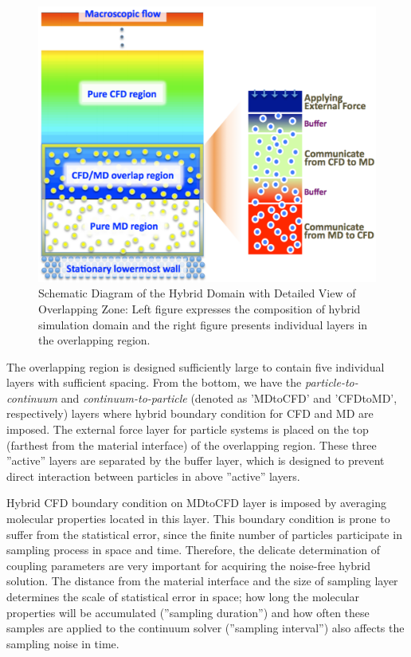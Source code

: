 \documentclass[]{aiaa-tc}%
\begin{document}
\begin{figure}
\centering
\includegraphics[width=0.6\linewidth]{Hybrid_Schematic.pdf}
\caption{Schematic Diagram of the Hybrid Domain with Detailed View of Overlapping Zone: 
Left figure expresses the composition of hybrid simulation domain and 
the right figure presents individual layers in the overlapping region.}
\label{Fig:Couette}
\end{figure}


The overlapping region is designed sufficiently large to contain 
five individual layers with sufficient spacing. From the bottom, 
we have the {\it{particle-to-continuum}} and {\it{continuum-to-particle}} 
(denoted as 'MDtoCFD' and 'CFDtoMD', respectively) layers where hybrid
boundary condition for CFD and MD are imposed. The external force layer
for particle systems is placed on the top (farthest from the
material interface) of the overlapping region. These three ''active'' layers 
are separated by the buffer layer, which is designed to prevent direct 
interaction between particles in above ''active'' layers.

Hybrid CFD boundary condition on MDtoCFD layer is imposed by averaging
molecular properties located in this layer. This boundary condition is prone to
suffer from the statistical error\cite{Hadjicon3,Time_Mechanism}, since
the finite number of particles participate in sampling process in space and time.
Therefore, the delicate determination of coupling parameters are very important
for acquiring the noise-free hybrid solution. The distance from the material 
interface and the size of sampling layer determines the scale of statistical 
error in space; how long the molecular properties will be accumulated
(''sampling duration'') and how often these samples are applied to the 
continuum solver (''sampling interval'') also affects the sampling noise in time.
\end{document}
